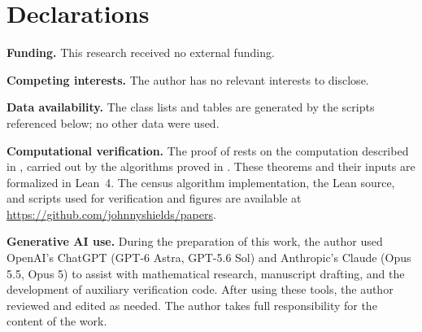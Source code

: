 \documentclass[11pt,a4paper]{amsart}
\numberwithin{equation}{section}
\theoremstyle{plain}
\theoremstyle{definition}
\begin{document}
\section*{Declarations}
{\footnotesize

\noindent\textbf{Funding.} This research received no external funding.

\smallskip
\noindent\textbf{Competing interests.} The author has no relevant interests to disclose.

\smallskip
\noindent\textbf{Data availability.} The class lists and tables are generated by the scripts referenced below; no other data were used.

\smallskip
\noindent\textbf{Computational verification.} The proof of  rests on the computation described in , carried out by the algorithms proved in .  These theorems and their inputs are formalized in Lean~4.  The census algorithm implementation, the Lean source, and scripts used for verification and figures are available at \url{https://github.com/johnnyshields/papers}.

\smallskip
\noindent\textbf{Generative AI use.} During the preparation of this work, the author used OpenAI's ChatGPT (GPT-6 Astra, GPT-5.6 Sol) and Anthropic's Claude (Opus 5.5, Opus 5) to assist with mathematical research, manuscript drafting, and the development of auxiliary verification code.  After using these tools, the author reviewed and edited as needed.  The author takes full responsibility for the content of the work.\par}
\end{document}
